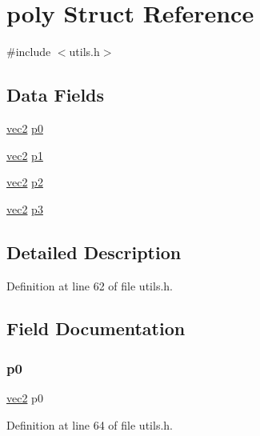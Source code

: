 \hypertarget{structpoly}{}\section{poly Struct Reference}
\label{structpoly}


{\ttfamily \#include $<$utils.\+h$>$}

\subsection*{Data Fields}
\begin{DoxyCompactItemize}
\item 
\mbox{\hyperlink{structvec2}{vec2}} \mbox{\hyperlink{structpoly_a14aa6192dcd0749e0910a366ada2606a}{p0}}
\item 
\mbox{\hyperlink{structvec2}{vec2}} \mbox{\hyperlink{structpoly_a4911be3e6b050798b344c4d3f7624244}{p1}}
\item 
\mbox{\hyperlink{structvec2}{vec2}} \mbox{\hyperlink{structpoly_a11216c2564b7f4dc65bd23c56a3799f3}{p2}}
\item 
\mbox{\hyperlink{structvec2}{vec2}} \mbox{\hyperlink{structpoly_a47acacffb877abbd6df0ed40a9f1c3ad}{p3}}
\end{DoxyCompactItemize}


\subsection{Detailed Description}


Definition at line 62 of file utils.\+h.



\subsection{Field Documentation}
\mbox{\label{structpoly_a14aa6192dcd0749e0910a366ada2606a}} 
\subsubsection{\texorpdfstring{p0}{p0}}
{\footnotesize\ttfamily \mbox{\hyperlink{structvec2}{vec2}} p0}



Definition at line 64 of file utils.\+h.

\mbox{\label{structpoly_a4911be3e6b050798b344c4d3f7624244}} 

